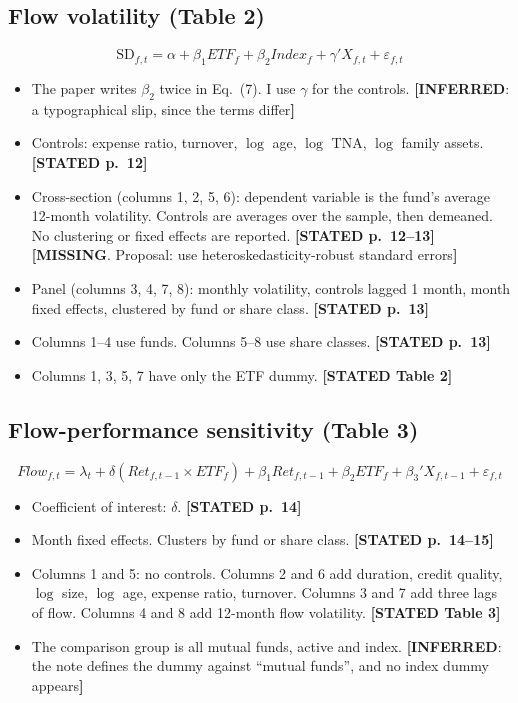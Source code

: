 \documentclass[10pt,a4paper]{article}
\newcommand{\ST}[1]{\textcolor{cst}{\textbf{[STATED #1]}}}
\newcommand{\IN}[1]{\textcolor{cin}{\textbf{[INFERRED}: #1\textbf{]}}}
\newcommand{\MI}[1]{\textcolor{cmi}{\textbf{[MISSING}. Proposal: #1\textbf{]}}}
\begin{document}
\subsection{Flow volatility (Table 2)}
\begin{equation}\label{eq:vol}
\mathrm{SD}_{f,t}=\alpha+\beta_1\mathit{ETF}_f+\beta_2\mathit{Index}_f+\gamma' X_{f,t}+\varepsilon_{f,t}
\end{equation}
\begin{itemize}
\item The paper writes $\beta_2$ twice in Eq.~(7). I use $\gamma$ for the controls. \IN{a typographical slip, since the terms differ}
\item Controls: expense ratio, turnover, $\log$ age, $\log$ TNA, $\log$ family assets. \ST{p.~12}
\item Cross-section (columns 1, 2, 5, 6): dependent variable is the fund's average 12-month volatility. Controls are averages over the sample, then demeaned. No clustering or fixed effects are reported. \ST{p.~12--13} \MI{use heteroskedasticity-robust standard errors}
\item Panel (columns 3, 4, 7, 8): monthly volatility, controls lagged 1 month, month fixed effects, clustered by fund or share class. \ST{p.~13}
\item Columns 1--4 use funds. Columns 5--8 use share classes. \ST{p.~13}
\item Columns 1, 3, 5, 7 have only the ETF dummy. \ST{Table 2}
\end{itemize}

\subsection{Flow-performance sensitivity (Table 3)}
\begin{equation}\label{eq:fps}
\mathit{Flow}_{f,t}=\lambda_t+\delta(\mathit{Ret}_{f,t-1}\times\mathit{ETF}_f)+\beta_1\mathit{Ret}_{f,t-1}+\beta_2\mathit{ETF}_f+\beta_3' X_{f,t-1}+\varepsilon_{f,t}
\end{equation}
\begin{itemize}
\item Coefficient of interest: $\delta$. \ST{p.~14}
\item Month fixed effects. Clusters by fund or share class. \ST{p.~14--15}
\item Columns 1 and 5: no controls. Columns 2 and 6 add duration, credit quality, $\log$ size, $\log$ age, expense ratio, turnover. Columns 3 and 7 add three lags of flow. Columns 4 and 8 add 12-month flow volatility. \ST{Table 3}
\item The comparison group is all mutual funds, active and index. \IN{the note defines the dummy against ``mutual funds'', and no index dummy appears}
\end{itemize}
\end{document}
